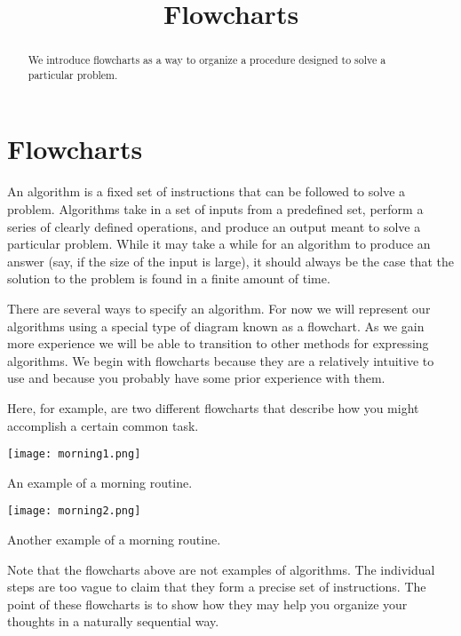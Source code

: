 \documentclass{ximera}
\title{Flowcharts}
\begin{document}
  
\begin{abstract}  
We introduce flowcharts as a way to organize a procedure designed to solve a particular problem.
\end{abstract}  
\maketitle

\section{Flowcharts}
An algorithm is a fixed set of instructions that can be followed to solve a problem. Algorithms take in a set of inputs from a predefined set, perform a series of clearly defined operations, and produce an output meant to solve a particular problem. While it may take a while for an algorithm to produce an answer (say, if the size of the input is large), it should always be the case that the solution to the problem is found in a finite amount of time.

There are several ways to specify an algorithm. For now we will represent our algorithms using a special type of diagram known as a flowchart. As we gain more experience we will be able to transition to other methods for expressing algorithms. We begin with flowcharts because they are a relatively intuitive to use and because you probably have some prior experience with them.

Here, for example, are two different flowcharts that describe how you might accomplish a certain common task. 

\begin{center}
	\texttt{[image: morning1.png]}
\end{center}
\begin{center}
	An example of a morning routine.
\end{center}

\begin{center}
	\texttt{[image: morning2.png]}
\end{center}
\begin{center}
	Another example of a morning routine.
\end{center}

Note that the flowcharts above are not examples of algorithms. The individual steps are too vague to claim that they form a precise set of instructions. The point of these flowcharts is to show how they may help you organize your thoughts in a naturally sequential way.
\end{document}
